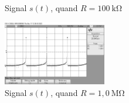 \documentclass[a4paper,landscape]{article}
\def\figsize{0.4\textwidth}
\begin{document}
\begin{multicols}{2}
\begin{figure}[H]
			\caption{Signal $s(t)$, quand $R = 100\:\mathrm{k\Omega}$}
		\end{figure}
		\hfill
		\begin{figure}[H]
			\centering
			\includegraphics[width=\figsize]{figures/scope_5.png}
			\caption{Signal $s(t)$, quand $R = 1{,}0\:\mathrm{M\Omega}$}
		\end{figure}
	\end{multicols}
\end{document}

